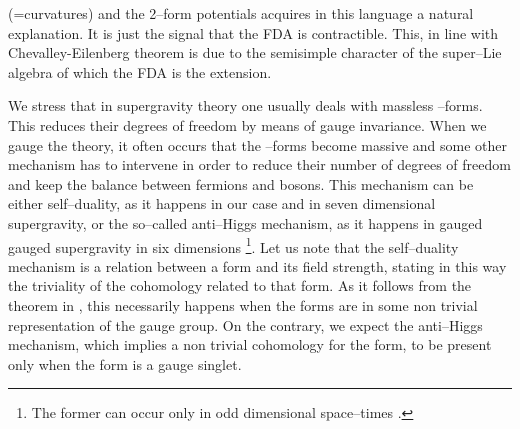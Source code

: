 \documentclass[a4paper,12pt]{article}
\begin{document}
(=curvatures) and the 2--form potentials acquires in this language
a natural explanation. It is just the signal that the FDA is
contractible. This, in line with Chevalley-Eilenberg theorem is
due to the semisimple character of the super--Lie algebra of which
the FDA is the extension.
\par
We  stress that in  supergravity theory one usually deals  with
massless \coordHE{}--forms. This reduces their degrees of freedom by
means of gauge invariance. When we gauge the theory, it often
occurs that the \coordHE{}--forms become massive and some other mechanism
has to intervene in order to reduce their number of degrees of
freedom and keep the balance between fermions and bosons. This
mechanism can be either self--duality, as it happens in our case
and in seven dimensional supergravity, or the so--called
anti--Higgs mechanism, as it happens in gauged \coordHE{} gauged
supergravity in six dimensions \cite{F4} \footnote{The former can
occur only in odd dimensional space--times \cite{townsend}.}. Let
us note that the self--duality mechanism is a relation  between a
form and its field strength, stating in this way the triviality of
the cohomology related to that form. As it follows from the
theorem  in \cite{sull}, this necessarily happens when the forms
are in some non trivial representation of the gauge group. On the
contrary, we expect the anti--Higgs mechanism, which implies a non
trivial cohomology for the form, to be present only when the form
is a gauge singlet.
\end{document}
